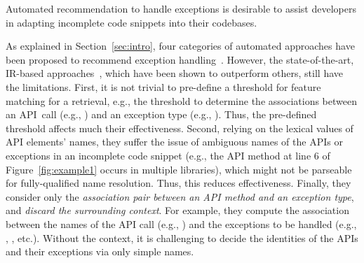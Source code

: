 \begin{Observation} 
\label{ob1}
Automated recommendation to handle exceptions is desirable to
assist developers in adapting incomplete code snippets into their
codebases.
\end{Observation}


As explained in Section~\ref{sec:intro},  four
categories of automated approaches have been proposed to recommend
exception
handling~\cite{xrank-fse20,barbosa-bsse12,chanchal-scam14,barbosa-tse18,barbosa-tse16}.
However, the state-of-the-art, IR-based approaches~\cite{xrank-fse20},
which have been shown to outperform others, still have the
limitations. First, it is not trivial to pre-define a threshold for
feature matching for a retrieval, e.g., the threshold to determine the
associations between an API~call (e.g., )
and an exception type (e.g., ). Thus,
the pre-defined threshold affects much their effectiveness.
%
Second, relying on the lexical values of API elements' names, they
suffer the issue of ambiguous names of the APIs or exceptions in an
incomplete code snippet (e.g., the API method  at line 6 of
Figure~\ref{fig:example1} occurs in multiple libraries), which might
not be parseable for fully-qualified name resolution. Thus, this
reduces effectiveness. Finally, they consider only the {\em
  association pair between an API method and an exception type}, and
{\em discard the surrounding context}.
For example, they compute the association between the names of the API
call (e.g., ) and the exceptions to be
handled (e.g., ,
, etc.). Without the context, it is
challenging to decide the identities of the APIs and their exceptions via
only simple names.

